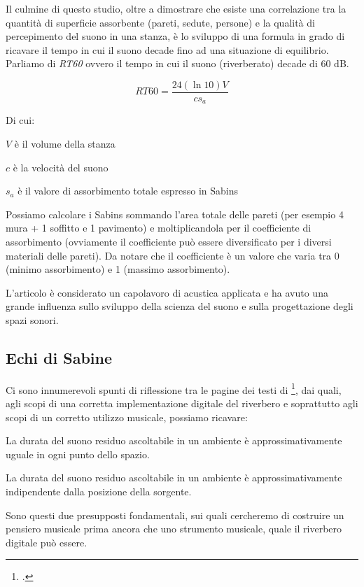 

Il culmine di questo studio, oltre a dimostrare che esiste una correlazione tra la quantità di 
superficie assorbente (pareti, sedute, persone) e la qualità di percepimento del suono in una 
stanza, è lo sviluppo di una formula in grado di ricavare il tempo in cui il suono decade fino ad 
una situazione di equilibrio.
Parliamo di \emph{RT60} ovvero il tempo in cui il suono (riverberato) decade di 60 dB.

\begin{equation}
RT60 = \frac{24(\ln{10})V}{c s_a}
\end{equation}

Di cui:
\begin{compactitem}
\item $V$ è il volume della stanza
\item $c$ è la velocità del suono
\item $s_a$ è il valore di assorbimento totale espresso in Sabins
\end{compactitem}

Possiamo calcolare i Sabins sommando l’area totale delle pareti 
(per esempio 4 mura + 1 soffitto e 1 pavimento) e moltiplicandola per il coefficiente di
assorbimento (ovviamente il coefficiente può essere diversificato per i diversi materiali 
delle pareti). Da notare che il coefficiente è un valore che varia tra 0 (minimo assorbimento) 
e 1 (massimo assorbimento).

L’articolo è considerato un capolavoro di acustica applicata e ha avuto una grande influenza sullo
sviluppo della scienza del suono e sulla progettazione degli spazi sonori.

\subsection{Echi di Sabine}

Ci sono innumerevoli spunti di riflessione tra le pagine dei testi di \ws\footcite{ws:rev},
dai quali, agli scopi di una corretta implementazione digitale del riverbero e
soprattutto agli scopi di un corretto utilizzo musicale, possiamo ricavare:

\begin{compactitem}
  \item La durata del suono residuo ascoltabile in un ambiente è approssimativamente
  uguale in ogni punto dello spazio.
  \item La durata del suono residuo ascoltabile in un ambiente è approssimativamente
  indipendente dalla posizione della sorgente.
\end{compactitem}

Sono questi due presupposti fondamentali, sui quali cercheremo di costruire un
pensiero musicale prima ancora che uno strumento musicale, quale il riverbero
digitale può essere.

